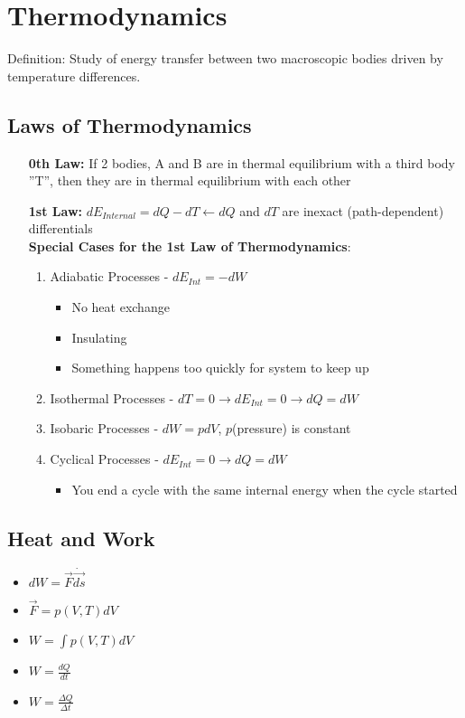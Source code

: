 \documentclass[10pt,letterpaper,final,twoside,notitlepage]{article}
\numberwithin{equation}{section} %
\theoremstyle{definition}
\begin{document}
\section{Thermodynamics} \label{sec:Thermo}
Definition: Study of energy transfer between two macroscopic bodies driven by temperature differences.

	\subsection*{Laws of Thermodynamics} \label{subsec:Thermo Laws}
		\begin{enumerate}
			\item[\textbf{0th Law:}] If 2 bodies, A and B are in thermal equilibrium with a third body ''T'', then they are in thermal equilibrium with each other
			\item[\textbf{1st Law:}] $dE_{Internal} = dQ - dT \leftarrow dQ$ and $dT$ are inexact (path-dependent) differentials \\
			\textbf{Special Cases for the 1st Law of Thermodynamics}:
			\begin{enumerate}
				\item Adiabatic Processes - $dE_{Int} = -dW$
				\begin{itemize}[noitemsep, nolistsep]
					\item No heat exchange
					\item Insulating
					\item Something happens too quickly for system to keep up
				\end{itemize}
				\item Isothermal Processes - $dT = 0 \rightarrow dE_{Int} = 0 \rightarrow dQ = dW$
				\item Isobaric Processes - $dW = pdV$, $p$(pressure) is constant
				\item Cyclical Processes - $dE_{Int} = 0 \rightarrow dQ = dW$
				\begin{itemize}[noitemsep, nolistsep]
					\item You end a cycle with the same internal energy when the cycle started
				\end{itemize}
			\end{enumerate}
		\end{enumerate}
	
	\subsection*{Heat and Work} \label{subsec:Heat/Work}
	\begin{itemize}[noitemsep, nolistsep]
		\item $dW = \vec{F} \dot \vec{ds}$
		\item $\vec{F} = p \left( V, T \right) dV$
		\item $W = \int p \left( V, T \right) dV$
		\item $W = \frac{dQ}{dt}$
		\item $W = \frac{\Delta Q}{\Delta t}$
	\end{itemize}
\end{document}
